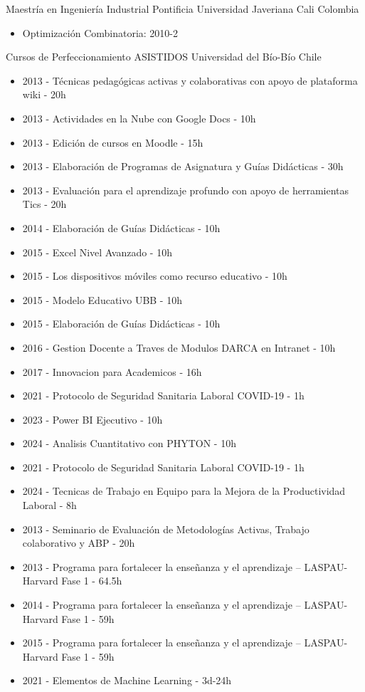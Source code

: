 
{Maestr\'ia en Ingenier\'ia Industrial}
{Pontificia Universidad Javeriana Cali}
{Colombia}
{}
{\begin{itemize}
\item Optimizaci\'on Combinatoria: 2010-2
\end{itemize}}


{Cursos de Perfeccionamiento ASISTIDOS}
{Universidad del B\'io-B\'io}
{Chile}
{}
{\begin{itemize}
\item 2013 - T\'ecnicas pedag\'ogicas activas y colaborativas con apoyo de plataforma wiki - 20h
\item 2013 - Actividades en la Nube con Google Docs - 10h
\item 2013 - Edici\'on de cursos en Moodle - 15h
\item 2013 - Elaboraci\'on de Programas de Asignatura y Gu\'ias Did\'acticas - 30h
\item 2013 - Evaluaci\'on para el aprendizaje profundo con apoyo de herramientas Tics - 20h
\item 2014 - Elaboraci\'on de Gu\'ias Did\'acticas - 10h
\item 2015 - Excel Nivel Avanzado - 10h
\item 2015 - Los dispositivos m\'oviles como recurso educativo - 10h
\item 2015 - Modelo Educativo UBB - 10h
\item 2015 - Elaboraci\'on de Gu\'ias Did\'acticas - 10h
\item 2016 - Gestion Docente a Traves de Modulos DARCA en Intranet - 10h
\item 2017 - Innovacion para Academicos - 16h
\item 2021 - Protocolo de Seguridad Sanitaria Laboral COVID-19 - 1h
\item 2023 - Power BI Ejecutivo - 10h
\item 2024 - Analisis Cuantitativo con PHYTON - 10h
\item 2021 - Protocolo de Seguridad Sanitaria Laboral COVID-19 - 1h
\item 2024 - Tecnicas de Trabajo en Equipo para la Mejora de la Productividad Laboral - 8h
\item 2013 - Seminario de Evaluaci\'on de Metodolog\'ias Activas, Trabajo colaborativo y ABP - 20h
\item 2013 - Programa para fortalecer la enseñanza y el aprendizaje – LASPAU-Harvard Fase 1 - 64.5h
\item 2014 - Programa para fortalecer la enseñanza y el aprendizaje – LASPAU-Harvard Fase 1 - 59h
\item 2015 - Programa para fortalecer la enseñanza y el aprendizaje – LASPAU-Harvard Fase 1 - 59h
\item 2021 - Elementos de Machine Learning - 3d-24h
\end{itemize}}

\clearpage